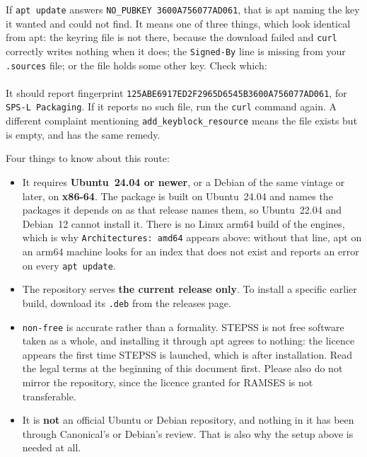 If {\tt apt update} answers {\tt NO\_PUBKEY 3600A756077AD061}, that is apt naming the key it wanted and could not find. It means one of three things, which look identical from apt: the keyring file is not there, because the download failed and {\tt curl} correctly writes nothing when it does; the {\tt Signed-By} line is missing from your {\tt .sources} file; or the file holds some other key. Check which:\\
\\
It should report fingerprint {\tt 125ABE6917ED2F2965D6545B3600A756077AD061}, for {\tt SPS-L Packaging}. If it reports no such file, run the {\tt curl} command again. A different complaint mentioning {\tt add\_keyblock\_resource} means the file exists but is empty, and has the same remedy.

Four things to know about this route:
\begin{itemize}
\item It requires {\bf Ubuntu~24.04 or newer}, or a Debian of the same vintage or later, on {\bf x86-64}. The package is built on Ubuntu~24.04 and names the packages it depends on as that release names them, so Ubuntu~22.04 and Debian~12 cannot install it. There is no Linux arm64 build of the engines, which is why {\tt Architectures: amd64} appears above: without that line, apt on an arm64 machine looks for an index that does not exist and reports an error on every {\tt apt update}.
\item The repository serves {\bf the current release only}. To install a specific earlier build, download its {\tt .deb} from the releases page.
\item {\tt non-free} is accurate rather than a formality. STEPSS is not free software taken as a whole, and installing it through apt agrees to nothing: the licence appears the first time STEPSS is launched, which is after installation. Read the legal terms at the beginning of this document first. Please also do not mirror the repository, since the licence granted for RAMSES is not transferable.
\item It is {\bf not} an official Ubuntu or Debian repository, and nothing in it has been through Canonical's or Debian's review. That is also why the setup above is needed at all.
\end{itemize}

